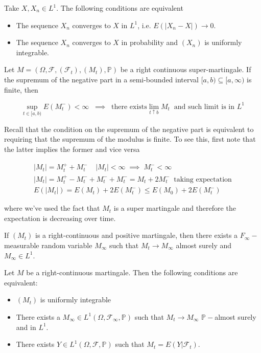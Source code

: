 \begin{theorem}
    Take $X,X_n \in L^1$. The following conditions are equivalent 
    \begin{itemize}
        \item The sequence $X_n$ converges to $X$ in $L^1$, i.e. $E(\vert X_n - X\vert) \to 0$. 
        \item The sequence $X_n$ converges to $X$ in probability and $(X_n)$ is uniformly integrable. 
    \end{itemize}
\end{theorem}

\begin{theorem}
    Let $M = (\Omega, \mathcal{F},(\mathcal{F}_t),(M_t),\mathbb{P})$ be a right continuous super-martingale. If the supremum of the negative part in a semi-bounded interval $[a,b) \subseteq [a,\infty)$ is finite, then

    \begin{equation*}
        \sup_{t \in [a,b)} E(M_t^-) < \infty \;\; \implies \;\; \text{there exists} \lim_{t \uparrow b} M_t \;\; \text{and such limit is in } L^1
    \end{equation*}
\end{theorem}

Recall that the condition on the supremum of the negative part is equivalent to requiring that the supremum of the modulus is finite. To see this, first note that the latter implies the former and vice versa

\begin{gather*}
    \vert M_t \vert = M_t^+ + M_t^- \;\;\;\; \vert M_t \vert < \infty \; \implies \; M_t^- < \infty \\
    \vert M_t \vert = M_t^+ - M_t^- + M_t^- + M_t^- = M_t + 2 M_t^- \;\; \text{taking expectation} \\
    E(\vert M_t \vert) = E(M_t) + 2 E(M_t^-) \leq E(M_0) + 2 E(M_t^-)
\end{gather*}

where we've used the fact that $M_t$ is a super martingale and therefore the expectation is decreasing over time. 

\begin{corollary}
    If $(M_t)$ is a right-continuous and positive martingale, then there exists a $F_{\infty}-$measurable random variable $M_{\infty}$ such that $M_t \to M_{\infty}$ almost surely and $M_{\infty} \in L^1$. 
\end{corollary}

\begin{theorem}[Convergence in $L^1$]
    Let $M$ be a right-continuous martingale. Then the following conditions are equivalent:
    \begin{itemize}
        \item $(M_t)$ is uniformly integrable
        \item There exists a $M_{\infty} \in L^1(\Omega,\mathcal{F}_{\infty}, \mathbb{P})$ such that $M_t \to M_{\infty}$ $\mathbb{P}-$almost surely and in $L^1$. 
        \item There exists $Y \in L^1(\Omega,\mathcal{F},\mathbb{P})$ such that $M_t = E(Y \vert \mathcal{F}_t)$. 
    \end{itemize}
\end{theorem}

